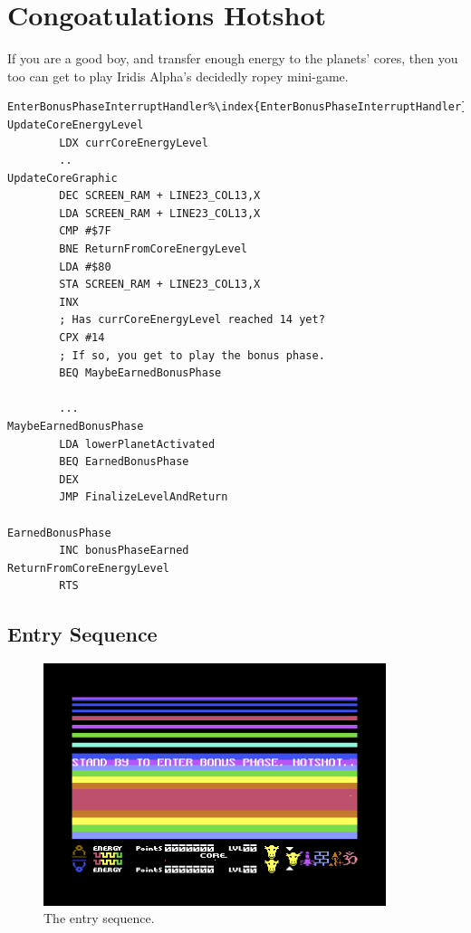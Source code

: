 \chapter{Congoatulations Hotshot} 
\label{sec:bonus}
\lstset{style=6502Style}

If you are a good boy, and transfer enough energy to the planets' cores, then you too can
get to play Iridis Alpha's decidedly ropey mini-game. 

\begin{lstlisting}[escapechar=\%, caption=\icode{bonusPhaseEarned} is set once \icode{currCoreEnergyLevel} reaches 14.]
EnterBonusPhaseInterruptHandler%\index{EnterBonusPhaseInterruptHandler}%   
UpdateCoreEnergyLevel
        LDX currCoreEnergyLevel
        ..
UpdateCoreGraphic   
        DEC SCREEN_RAM + LINE23_COL13,X
        LDA SCREEN_RAM + LINE23_COL13,X
        CMP #$7F
        BNE ReturnFromCoreEnergyLevel
        LDA #$80
        STA SCREEN_RAM + LINE23_COL13,X
        INX
        ; Has currCoreEnergyLevel reached 14 yet?
        CPX #14
        ; If so, you get to play the bonus phase.
        BEQ MaybeEarnedBonusPhase

        ...
MaybeEarnedBonusPhase   
        LDA lowerPlanetActivated
        BEQ EarnedBonusPhase
        DEX
        JMP FinalizeLevelAndReturn

EarnedBonusPhase   
        INC bonusPhaseEarned
ReturnFromCoreEnergyLevel   
        RTS
\end{lstlisting}

\section{Entry Sequence}
\begin{figure}[H]
    \centering
      \includegraphics[width=10cm]{src/bonusphase/entry/bonus_entry_example.png}%
\caption{The entry sequence.}
\end{figure}

